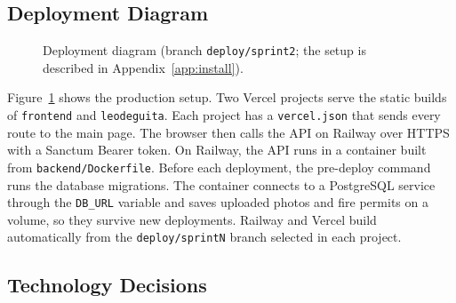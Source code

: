 \subsection{Deployment Diagram}

\begin{figure}[H]
  \centering
  \resizebox{\linewidth}{!}{}
  \caption{Deployment diagram (branch \texttt{deploy/sprint2}; the setup is described in Appendix~\ref{app:install}).}
  \label{fig:deployment}
\end{figure}

Figure~\ref{fig:deployment} shows the production setup.
Two Vercel projects serve the static builds of \texttt{frontend} and \texttt{leodeguita}.
Each project has a \texttt{vercel.json} that sends every route to the main page.
The browser then calls the API on Railway over HTTPS with a Sanctum Bearer token.
On Railway, the API runs in a container built from \texttt{backend/Dockerfile}.
Before each deployment, the pre-deploy command runs the database migrations.
The container connects to a PostgreSQL service through the \texttt{DB\_URL} variable and saves uploaded photos and fire permits on a volume, so they survive new deployments.
Railway and Vercel build automatically from the \texttt{deploy/sprintN} branch selected in each project.

\subsection{Technology Decisions}

